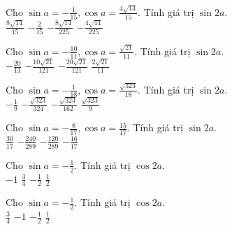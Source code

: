 \documentclass[12pt,a4paper]{article}
\begin{document}
\begin{ex}
 Cho $\sin a= - \frac{1}{15}, \cos a=\frac{4 \sqrt{14}}{15}$. Tính giá trị $\sin 2a$. \\ 
\choice
{ $ \frac{8 \sqrt{14}}{15} $ }
   { $ - \frac{2}{15} $ }
     { \True $ - \frac{8 \sqrt{14}}{225} $ }
    { $ - \frac{4 \sqrt{14}}{225} $ }
\loigiai{ 
  
 }\end{ex}

\begin{ex}
 Cho $\sin a= - \frac{10}{11}, \cos a=\frac{\sqrt{21}}{11}$. Tính giá trị $\sin 2a$. \\ 
\choice
{ $ - \frac{20}{11} $ }
   { $ - \frac{10 \sqrt{21}}{121} $ }
     { \True $ - \frac{20 \sqrt{21}}{121} $ }
    { $ \frac{2 \sqrt{21}}{11} $ }
\loigiai{ 
  
 }\end{ex}

\begin{ex}
 Cho $\sin a= - \frac{1}{18}, \cos a=\frac{\sqrt{323}}{18}$. Tính giá trị $\sin 2a$. \\ 
\choice
{ $ - \frac{1}{9} $ }
   { $ - \frac{\sqrt{323}}{324} $ }
     { \True $ - \frac{\sqrt{323}}{162} $ }
    { $ \frac{\sqrt{323}}{9} $ }
\loigiai{ 
  
 }\end{ex}

\begin{ex}
 Cho $\sin a= - \frac{8}{17}, \cos a=\frac{15}{17}$. Tính giá trị $\sin 2a$. \\ 
\choice
{ $ \frac{30}{17} $ }
   { \True $ - \frac{240}{289} $ }
     { $ - \frac{120}{289} $ }
    { $ - \frac{16}{17} $ }
\loigiai{ 
  
 }\end{ex}

\begin{ex}
 Cho $\sin a= - \frac{1}{2}$. Tính giá trị $\cos 2a$. \\ 
\choice
{ $ -1 $ }
   { $ \frac{3}{4} $ }
     { $ - \frac{1}{2} $ }
    { \True $ \frac{1}{2} $ }
\loigiai{ 
  
 }\end{ex}

\begin{ex}
 Cho $\sin a= - \frac{1}{2}$. Tính giá trị $\cos 2a$. \\ 
\choice
{ $ \frac{3}{4} $ }
   { $ -1 $ }
     { $ - \frac{1}{2} $ }
    { \True $ \frac{1}{2} $ }
\loigiai{ 
  
 }\end{ex}
\end{document}
